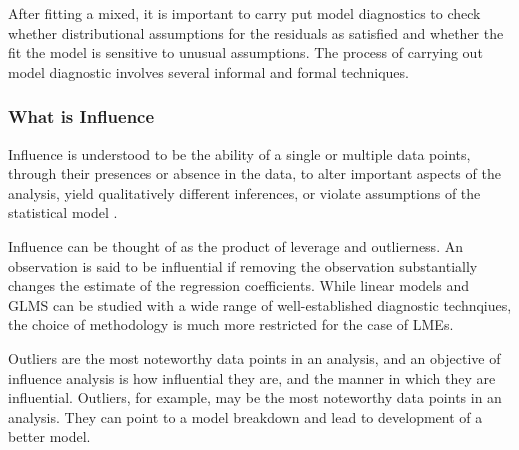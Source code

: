 \documentclass[12pt, a4paper]{report}
\theoremstyle{plain}
\theoremstyle{definition}
\theoremstyle{remark}
\begin{document}
	After fitting a mixed, it is important to carry put model diagnostics to check whether distributional assumptions for the
	residuals as satisfied and whether the fit the model is sensitive to unusual assumptions. The process of carrying out model
	diagnostic involves several informal and formal techniques.
	
	
	\subsubsection{What is Influence} %
	Influence is understood to be the ability of a single or multiple data points, through their presences or absence in the data, to
	alter important aspects of the analysis, yield qualitatively different inferences, or violate assumptions of the statistical
	model \citep{schabenberger}.
	
	Influence can be thought of as the product of leverage and outlierness. An observation is said to be influential if removing the observation substantially changes the estimate of the regression coefficients.  While linear models and GLMS can be studied with a wide range of well-established diagnostic technqiues, the choice of methodology is much more restricted for the case of LMEs.
	
	Outliers are the most noteworthy data points in an analysis, and an objective of influence analysis is how influential they are,
	and the manner in which they are influential. Outliers, for example, may be the most noteworthy data points in
	an analysis. They can point to a model breakdown and lead to development of a better model.
	
	
\end{document}
